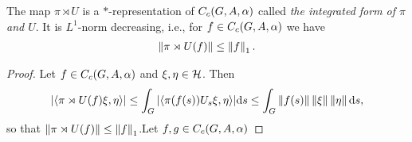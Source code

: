 \begin{lemma}
	The map $\pi \rtimes U$ is a $*$-representation of $C_c(G,A,\alpha)$ called \emph{the integrated form of $\pi$ and $U$}. It is $L^1$-norm decreasing, i.e., for $f \in C_c(G,A,\alpha)$ we have
	\begin{align*}
	\left\lVert \pi \rtimes U(f)\right\rVert \leq \left\lVert f \right\rVert_1.	
	\end{align*}
\end{lemma}
\begin{proof}
	Let $f \in C_c(G,A,\alpha)$ and $\xi , \eta \in \mathcal{H}$. Then
	\begin{align*}
		|\langle \pi \rtimes U(f) \xi, \eta \rangle | \leq \int_G | \langle \pi(f(s)) U_s \xi , \eta \rangle| \mathrm{d} s \leq \int_G \left\lVert f(s)\right\rVert  \left\lVert \xi\right\rVert \left\lVert \eta \right\rVert \mathrm{d} s,
	\end{align*}
	so that $\left\lVert \pi \rtimes U(f)\right\rVert \leq \left\lVert f \right\rVert_1$.Let $f,g \in C_c(G,A,\alpha)$ 
\end{proof}
